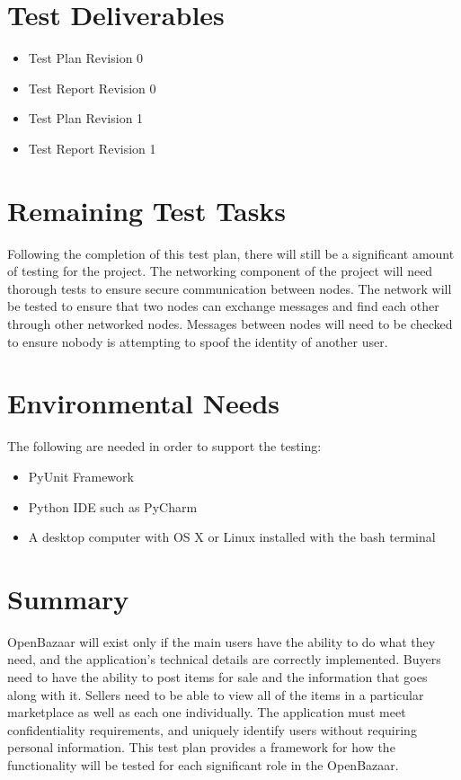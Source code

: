 \documentclass{article}
\begin{document}
\section*{Test Deliverables}
\begin{itemize}
 \item
Test Plan Revision 0
 \item
Test Report Revision 0
 \item
Test Plan Revision 1
 \item
Test Report Revision 1
\end{itemize}

\section*{Remaining Test Tasks}
Following the completion of this test plan, there will still be a significant amount of testing for the project. The networking component of the project will need thorough tests to ensure secure communication between nodes. The network will be tested to ensure that two nodes can exchange messages and find each other through other networked nodes. Messages between nodes will need to be checked to ensure nobody is attempting to spoof the identity of another user. 

\section*{Environmental Needs}
The following are needed in order to support the testing:
\newline
\begin{itemize}
 \item
PyUnit Framework
 \item
Python IDE such as PyCharm
 \item
A desktop computer with OS X or Linux installed with the bash terminal
\end{itemize}


\section*{Summary}
OpenBazaar will exist only if the main users have the ability to do what they need, and the application's technical details are correctly implemented.
Buyers need to have the ability to post items for sale and the information that goes along with it.
Sellers need to be able to view all of the items in a particular marketplace as well as each one individually.
The application must meet confidentiality requirements, and uniquely identify users without requiring personal information.
This test plan provides a framework for how the functionality will be tested for each significant role in the OpenBazaar.
\end{document}
